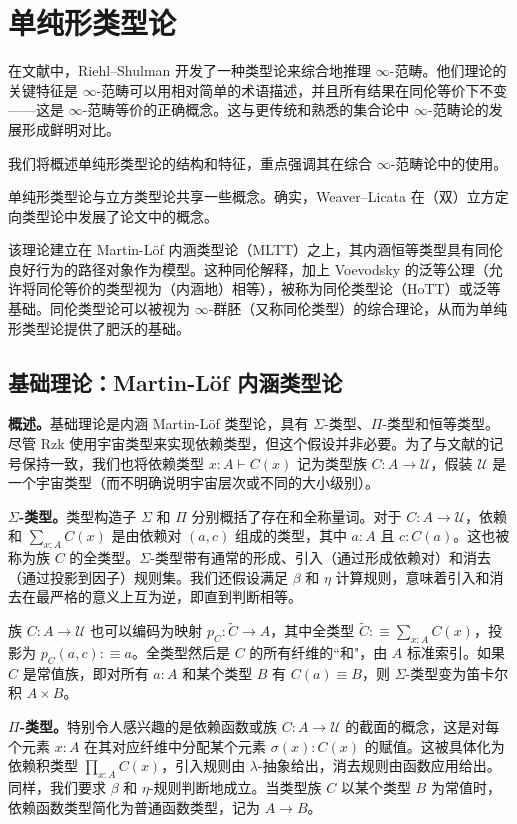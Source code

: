 \documentclass[12pt,a4paper]{article}
\theoremstyle{definition}
\theoremstyle{definition}
\begin{document}
\section{单纯形类型论}

在文献中，Riehl--Shulman 开发了一种类型论来综合地推理 $\infty$-范畴。他们理论的关键特征是 $\infty$-范畴可以用相对简单的术语描述，并且所有结果在同伦等价下不变——这是 $\infty$-范畴等价的正确概念。这与更传统和熟悉的集合论中 $\infty$-范畴论的发展形成鲜明对比。

我们将概述单纯形类型论的结构和特征，重点强调其在综合 $\infty$-范畴论中的使用。

单纯形类型论与立方类型论共享一些概念。确实，Weaver--Licata 在（双）立方定向类型论中发展了论文中的概念。

该理论建立在 Martin-L\"of 内涵类型论（MLTT）之上，其内涵恒等类型具有同伦良好行为的路径对象作为模型。这种同伦解释，加上 Voevodsky 的泛等公理（允许将同伦等价的类型视为（内涵地）相等），被称为同伦类型论（HoTT）或泛等基础。同伦类型论可以被视为 $\infty$-群胚（又称同伦类型）的综合理论，从而为单纯形类型论提供了肥沃的基础。

\subsection{基础理论：Martin-L\"of 内涵类型论}

\textbf{概述。}基础理论是内涵 Martin-L\"of 类型论，具有 $\Sigma$-类型、$\Pi$-类型和恒等类型。尽管 Rzk 使用宇宙类型来实现依赖类型，但这个假设并非必要。为了与文献的记号保持一致，我们也将依赖类型 $x:A \vdash C(x)$ 记为类型族 $C:A \to \mathcal{U}$，假装 $\mathcal{U}$ 是一个宇宙类型（而不明确说明宇宙层次或不同的大小级别）。

\textbf{$\Sigma$-类型。}类型构造子 $\Sigma$ 和 $\Pi$ 分别概括了存在和全称量词。对于 $C:A \to \mathcal{U}$，依赖和 $\sum_{x:A} C(x)$ 是由依赖对 $(a,c)$ 组成的类型，其中 $a:A$ 且 $c:C(a)$。这也被称为族 $C$ 的全类型。$\Sigma$-类型带有通常的形成、引入（通过形成依赖对）和消去（通过投影到因子）规则集。我们还假设满足 $\beta$ 和 $\eta$ 计算规则，意味着引入和消去在最严格的意义上互为逆，即直到判断相等。

族 $C:A \to \mathcal{U}$ 也可以编码为映射 $p_C:\widetilde{C} \to A$，其中全类型 $\widetilde{C}:\equiv \sum_{x:A} C(x)$，投影为 $p_C(a,c):\equiv a$。全类型然后是 $C$ 的所有纤维的``和"，由 $A$ 标准索引。如果 $C$ 是常值族，即对所有 $a:A$ 和某个类型 $B$ 有 $C(a) \equiv B$，则 $\Sigma$-类型变为笛卡尔积 $A \times B$。

\textbf{$\Pi$-类型。}特别令人感兴趣的是依赖函数或族 $C:A \to \mathcal{U}$ 的截面的概念，这是对每个元素 $x:A$ 在其对应纤维中分配某个元素 $\sigma(x):C(x)$ 的赋值。这被具体化为依赖积类型 $\prod_{x:A} C(x)$，引入规则由 $\lambda$-抽象给出，消去规则由函数应用给出。同样，我们要求 $\beta$ 和 $\eta$-规则判断地成立。当类型族 $C$ 以某个类型 $B$ 为常值时，依赖函数类型简化为普通函数类型，记为 $A \to B$。
\end{document}

